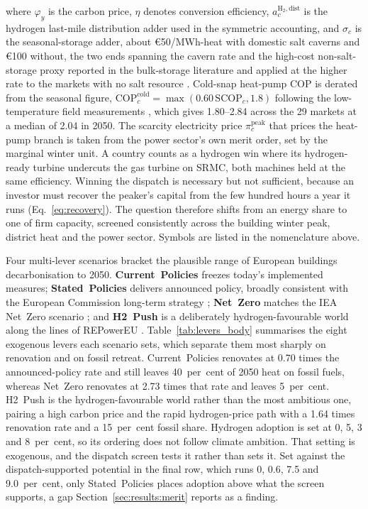 \noindent where $\varphi_{y}$ is the carbon price, $\eta$ denotes conversion efficiency, $a^{\mathrm{H_2,dist}}_{c}$ is the hydrogen last-mile distribution adder used in the symmetric accounting, and $\sigma_{c}$ is the seasonal-storage adder, about \euro{}50/MWh-heat with domestic salt caverns and \euro{}100 without, the two ends spanning the cavern rate and the high-cost non-salt-storage proxy reported in the bulk-storage literature \citep{Lord2014GeologicStorage,Papadias2021BulkStorage} and applied at the higher rate to the markets with no salt resource \citep{Caglayan2020caverns}. Cold-snap heat-pump COP is derated from the seasonal figure, $\mathrm{COP}^{\mathrm{cold}}_{c}=\max(0.60\,\mathrm{SCOP}_{c},1.8)$
following the low-temperature field measurements \citep{Gibb2023Coming}, which gives 1.80--2.84 across the 29
markets at a median of 2.04 in 2050. The scarcity electricity price
$\pi^{\mathrm{peak}}_{c}$ that prices the heat-pump branch is taken from the power
sector's own merit order, set by the marginal winter unit. A country counts as a hydrogen win where its hydrogen-ready turbine undercuts the gas turbine on SRMC, both machines held at the same efficiency.
Winning the dispatch is necessary but not sufficient, because an investor must recover the
peaker's capital from the few hundred hours a year it runs
(Eq.~\eqref{eq:recovery}). The question therefore shifts from an energy share to one of
firm capacity, screened consistently across the building winter peak, district heat and
the power sector. Symbols are listed in the nomenclature above.

Four multi-lever scenarios bracket the plausible range of European buildings
decarbonisation to 2050. \textbf{Current~Policies} freezes today's implemented measures;
\textbf{Stated~Policies} delivers announced policy, broadly consistent with the European
Commission long-term strategy \citep{EuropeanCommission2018LTS}; \textbf{Net~Zero}
matches the IEA Net~Zero scenario \citep{IEA2023NZE}; and \textbf{H2~Push} is a
deliberately hydrogen-favourable world along the lines of REPowerEU
\citep{REpowerEU2022}. Table~\ref{tab:levers_body} summarises the eight exogenous levers each scenario sets, which separate them most sharply on renovation and on fossil retreat. Current~Policies renovates at 0.70 times the announced-policy rate and still leaves 40~per~cent of 2050 heat on fossil fuels, whereas Net~Zero renovates at 2.73 times that rate and leaves 5~per~cent. H2~Push is the hydrogen-favourable world rather than the most ambitious one, pairing a high carbon price and the rapid hydrogen-price path with a 1.64 times renovation rate and a 15~per~cent fossil share. Hydrogen adoption is set at 0, 5, 3 and 8~per~cent, so its ordering does not follow climate ambition. That setting is exogenous, and the dispatch screen tests it rather than sets it. Set against the dispatch-supported potential in the final row, which runs 0, 0.6, 7.5 and 9.0~per~cent, only Stated~Policies places adoption above what the screen supports, a gap Section~\ref{sec:results:merit} reports as a finding.

